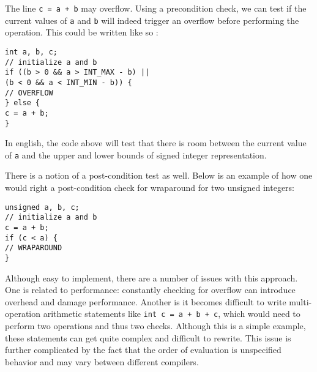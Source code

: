 The line \texttt{c = a + b} may overflow. Using a precondition check, we can test if the current values of \texttt{a} and \texttt{b} will indeed trigger an overflow before performing the operation. This could be written like so \cite{secure_coding}:

\begin{center}
\parbox{0.9\linewidth}{
\texttt{int a, b, c;\\
// initialize a and b\\
if ((b > 0 \&\& a > INT\_MAX - b) ||\\
\hspace*{2em}(b < 0 \&\& a < INT\_MIN - b)) \{\\
\hspace*{1.5em}// OVERFLOW\\
\} else \{\\
\hspace*{1.5em}c = a + b;\\
\}}
}
\end{center}
In english, the code above will test that there is room between the current value of \texttt{a} and the upper and lower bounds of signed integer representation.

There is a notion of a post-condition test as well. Below is an example of how one would right a post-condition check for wraparound for two unsigned integers:

\begin{center}
\parbox{0.9\linewidth}{
\texttt{unsigned a, b, c;\\
// initialize a and b\\
c = a + b;\\
if (c < a) \{\\
\hspace*{1.5em}// WRAPAROUND\\
\}}
}
\end{center}

Although easy to implement, there are a number of issues with this approach. One is related to performance: constantly checking for overflow can introduce overhead and damage performance. Another is it becomes difficult to write multi-operation arithmetic statements like \texttt{int c = a + b + c}, which would need to perform two operations and thus two checks. Although this is a simple example, these statements can get quite complex and difficult to rewrite. This issue is further complicated by the fact that the order of evaluation is unspecified behavior and may vary between different compilers.

